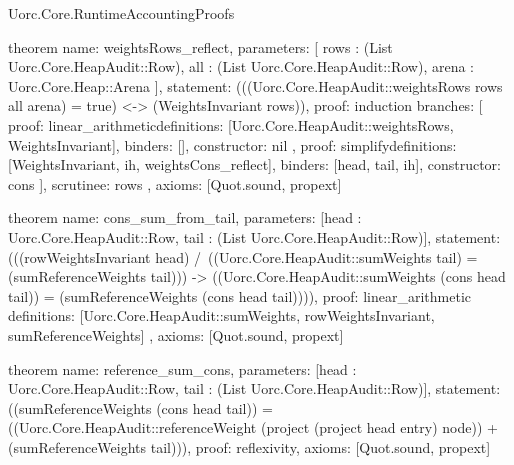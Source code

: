 \begin{lexlean}{Uorc.Core.RuntimeAccountingProofs}
\begin{semanticmodule}
theorem{
  name: weightsRows_reflect,
  parameters: [
    rows : (List Uorc.Core.HeapAudit::Row),
    all : (List Uorc.Core.HeapAudit::Row),
    arena : Uorc.Core.Heap::Arena
  ],
  statement: (((Uorc.Core.HeapAudit::weightsRows rows all arena) = true) <-> (WeightsInvariant rows)),
  proof: induction{
    branches: [
      {
        proof: linear_arithmetic{definitions: [Uorc.Core.HeapAudit::weightsRows, WeightsInvariant]},
        binders: [],
        constructor: nil
      },
      {
        proof: simplify{definitions: [WeightsInvariant, ih, weightsCons_reflect]},
        binders: [head, tail, ih],
        constructor: cons
      }
    ],
    scrutinee: rows
  },
  axioms: [Quot.sound, propext]
}

theorem{
  name: cons_sum_from_tail,
  parameters: [head : Uorc.Core.HeapAudit::Row, tail : (List Uorc.Core.HeapAudit::Row)],
  statement: (((rowWeightsInvariant head) /\ ((Uorc.Core.HeapAudit::sumWeights tail) = (sumReferenceWeights tail))) -> ((Uorc.Core.HeapAudit::sumWeights (cons head tail)) = (sumReferenceWeights (cons head tail)))),
  proof: linear_arithmetic{
    definitions: [Uorc.Core.HeapAudit::sumWeights, rowWeightsInvariant, sumReferenceWeights]
  },
  axioms: [Quot.sound, propext]
}

theorem{
  name: reference_sum_cons,
  parameters: [head : Uorc.Core.HeapAudit::Row, tail : (List Uorc.Core.HeapAudit::Row)],
  statement: ((sumReferenceWeights (cons head tail)) = ((Uorc.Core.HeapAudit::referenceWeight (project (project head entry) node)) + (sumReferenceWeights tail))),
  proof: reflexivity{},
  axioms: [Quot.sound, propext]
}
\end{semanticmodule}
\end{lexlean}

